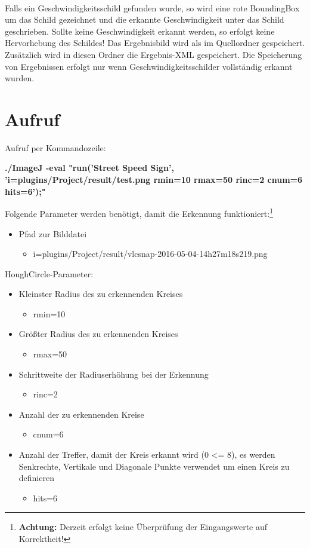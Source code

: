 \paragraph*{}
Falls ein Geschwindigkeitsschild gefunden wurde, so wird eine rote BoundingBox um das Schild gezeichnet und die erkannte Geschwindigkeit unter das Schild geschrieben.
Sollte keine Geschwindigkeit erkannt werden, so erfolgt keine Hervorhebung des Schildes!
Das Ergebnisbild wird als  im Quellordner gespeichert.
Zusätzlich wird in diesen Ordner die Ergebnis-XML gespeichert.
Die Speicherung von Ergebnissen erfolgt nur wenn Geschwindigkeitsschilder vollständig erkannt wurden.

\pagebreak
\section{Aufruf}
Aufruf per Kommandozeile:

\begin{small}
\textbf{./ImageJ -eval "run('Street Speed Sign', 'i=plugins/Project/result/test.png rmin=10 rmax=50 rinc=2 cnum=6 hits=6');"}
\end{small}

Folgende Parameter werden benötigt, damit die Erkennung funktioniert:\footnote{\textbf{Achtung:} Derzeit erfolgt keine Überprüfung der Eingangswerte auf Korrektheit!}


\begin{itemize}
	\item Pfad zur Bilddatei
	\begin{itemize}
		\item i=plugins/Project/result/vlcsnap-2016-05-04-14h27m18s219.png
	\end{itemize}
	\end{itemize}
HoughCircle-Parameter:
\begin{itemize}
	\item Kleinster Radius des zu erkennenden Kreises
	\begin{itemize}
		 \item rmin=10
	\end{itemize}
	\item Größter Radius des zu erkennenden Kreises
	\begin{itemize}
		\item rmax=50
	\end{itemize}
	\item Schrittweite der Radiuserhöhung bei der Erkennung
	\begin{itemize}
		\item rinc=2
	\end{itemize}
	\item Anzahl der zu erkennenden Kreise
	\begin{itemize}
		\item cnum=6
	\end{itemize}
	\item Anzahl der Treffer, damit der Kreis erkannt wird (0 <= 8), es werden Senkrechte, Vertikale und Diagonale Punkte verwendet um einen Kreis zu definieren
	\begin{itemize}
		\item hits=6
	\end{itemize}
\end{itemize}
